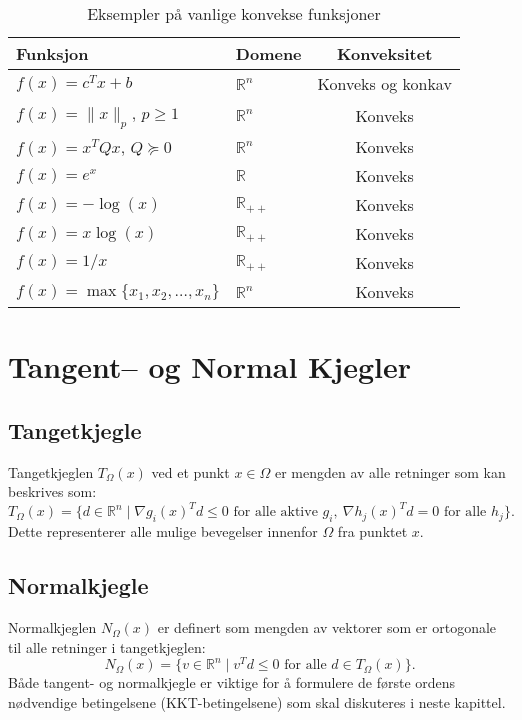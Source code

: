 \begin{table}[H]
	\centering
	\begin{tabular}{|l|l|c|}
		\hline
		\textbf{Funksjon}                          & \textbf{Domene}       & \textbf{Konveksitet} \\
		\hline
		\( f(x) = c^Tx + b \)                      & \( \mathbb{R}^n \)    & Konveks og konkav    \\
		\( f(x) = \|x\|_p \), \( p \geq 1 \)       & \( \mathbb{R}^n \)    & Konveks              \\
		\( f(x) = x^TQx \), \( Q \succeq 0 \)      & \( \mathbb{R}^n \)    & Konveks              \\
		\( f(x) = e^x \)                           & \( \mathbb{R} \)      & Konveks              \\
		\( f(x) = -\log(x) \)                      & \( \mathbb{R}_{++} \) & Konveks              \\
		\( f(x) = x\log(x) \)                      & \( \mathbb{R}_{++} \) & Konveks              \\
		\( f(x) = 1/x \)                           & \( \mathbb{R}_{++} \) & Konveks              \\
		\( f(x) = \max\{x_1, x_2, \ldots, x_n\} \) & \( \mathbb{R}^n \)    & Konveks              \\
		\hline
	\end{tabular}
	\caption{Eksempler på vanlige konvekse funksjoner}
	\label{tab:convex_functions}
\end{table}

\section{Tangent-- og Normal Kjegler}

\subsection{Tangetkjegle}
Tangetkjeglen \(T_{\Omega}(x)\) ved et punkt \(x \in \Omega\) er mengden av alle retninger som kan beskrives som:
\begin{equation*}
	T_{\Omega}(x) = \{d \in \mathbb{R}^n \mid \nabla g_i(x)^T d \leq 0 \text{ for alle aktive } g_i,\ \nabla h_j(x)^T d = 0 \text{ for alle } h_j\}.
\end{equation*}
Dette representerer alle mulige bevegelser innenfor \(\Omega\) fra punktet \(x\).

\subsection{Normalkjegle}
Normalkjeglen \(N_{\Omega}(x)\) er definert som mengden av vektorer som er ortogonale til alle retninger i tangetkjeglen:
\begin{equation*}
	N_{\Omega}(x) = \{v \in \mathbb{R}^n \mid v^T d \leq 0 \text{ for alle } d \in T_{\Omega}(x)\}.
\end{equation*}
Både tangent- og normalkjegle er viktige for å formulere de første ordens nødvendige betingelsene (KKT-betingelsene) som skal diskuteres i neste kapittel.

